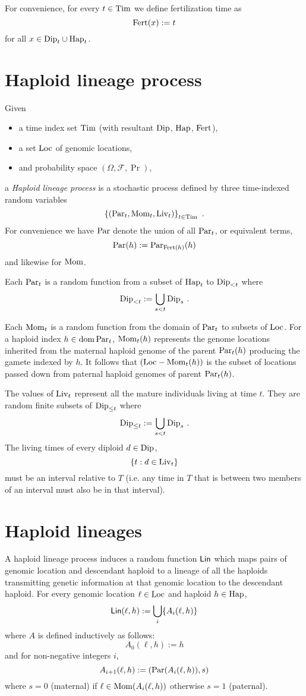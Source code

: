 \documentclass{article}
\begin{document}
For convenience, for every $t \in \mathrm{Tim}$ we define fertilization time as
$$
\mathrm{Fert}(x) := t
$$
for all $x \in \mathrm{Dip}_t \cup \mathrm{Hap}_t$.


\section{Haploid lineage process}

Given 
\begin{itemize}
\item
  a time index set $\mathrm{Tim}$ (with resultant $\mathrm{Dip}$, $\mathrm{Hap}$, $\mathrm{Fert}$),
\item
  a set $\mathrm{Loc}$ of genomic locations,
\item
  and probability space $(\Omega, \mathcal{F}, \Pr)$,
\end{itemize}
a \emph{Haploid lineage process} is a stochastic process defined by three time-indexed
random variables
$$
 \left\{ (\mathrm{Par}_t, \mathrm{Mom}_t, \mathrm{Liv}_t) \right\}_{t \in \mathrm{Tim}}
\text{ .}
$$
For convenience we have $\mathrm{Par}$ denote the union of all $\mathrm{Par}_t$, or equivalent terms,
$$
\mathrm{Par}(h) := \mathrm{Par}_{\mathrm{Fert}(h)}(h)
$$
and likewise for $\mathrm{Mom}$.

Each $\mathrm{Par}_t$ is a random function from a subset of $\mathrm{Hap}_t$ to $\mathrm{Dip}_{<t}$
where
$$
  \mathrm{Dip}_{<t} := \bigcup_{s < t} \mathrm{Dip}_s
\text{ .}
$$

Each $\mathrm{Mom}_t$ is a random function from the domain of $\mathrm{Par}_t$ to subsets of $\mathrm{Loc}$.
For a haploid index $h \in \operatorname{dom} \mathrm{Par}_t$,
$\mathrm{Mom}_t(h)$ represents the genome locations inherited from the maternal haploid genome of the
parent $\mathrm{Par}_t(h)$ producing the gamete indexed by $h$.
It follows that $(\mathrm{Loc} - \mathrm{Mom}_t(h))$ is the subset of locations passed down from
paternal haploid genomes of parent $\mathrm{Par}_t(h)$.


The values of $\mathrm{Liv}_t$ represent all the mature individuals living at time $t$.
They are random finite subsets of $\mathrm{Dip}_{\le t}$ where
$$
  \mathrm{Dip}_{\le t} := \bigcup_{s < t} \mathrm{Dip}_s
\text{ .}
$$
The living times of every diploid $d \in \mathrm{Dip}$,
$$
\{ t : d \in \mathrm{Liv}_t \}
$$
must be an interval relative to $T$ (i.e. any time in $T$ that is between two members of
an interval must also be in that interval).


\section{Haploid lineages}

A haploid lineage process induces a random function $\mathsf{Lin}$ which maps
pairs of genomic location and descendant haploid to a lineage of all the 
haploids transmitting genetic information at that genomic location to the descendant haploid.
For every genomic location $\ell \in \mathrm{Loc}$ and haploid $h \in \mathrm{Hap}$,
$$
\mathsf{Lin}(\ell, h) := \bigcup_{i} \{ A_i(\ell, h) \}
$$
where $A$ is defined inductively as follows:
$$
A_0(\ell, h) := h
$$
and for non-negative integers $i$,
$$
A_{i+1}(\ell, h) := (\mathrm{Par}(A_i(\ell, h)), s)
$$
where $s = 0$ (maternal) if $\ell \in \mathrm{Mom}(A_i(\ell, h))$
otherwise $s = 1$ (paternal).
\end{document}
